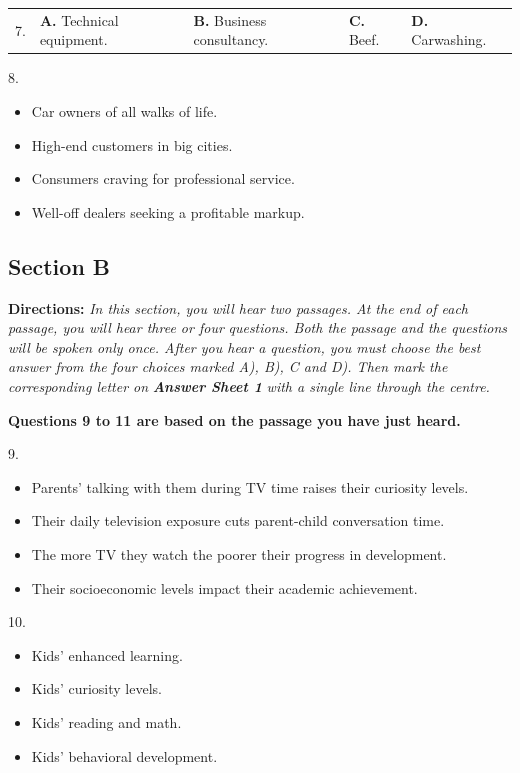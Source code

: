 \documentclass[UTF8,11pt]{ctexart}
\begin{document}
\noindent\begin{tabularx}{\linewidth}{@{}lXXXX@{}}7. & \textbf{A.} Technical equipment. & \textbf{B.} Business consultancy. & \textbf{C.} Beef. & \textbf{D.} Carwashing.\\\end{tabularx}\par

8.


\begin{itemize}[leftmargin=2em,itemsep=.2em,topsep=.4em]\item[A.] Car owners of all walks of life.
\item[B.] High-end customers in big cities.
\item[C.] Consumers craving for professional service.
\item[D.] Well-off dealers seeking a profitable markup.
\end{itemize}

\subsection*{\textbf{Section B}}


\textbf{Directions:} \textit{In this section, you will hear two passages. At the end of each passage, you will hear three or four} \textit{questions. Both the passage and the questions will be spoken only once. After you hear a question, you must} \textit{choose the best answer from the four choices marked A), B), C and D). Then mark the corresponding letter on} \textbf{\textit{Answer Sheet 1}}\textit{ with a single line through the centre.}


\textbf{Questions 9 to 11 are based on the passage you have just heard.}


9.


\begin{itemize}[leftmargin=2em,itemsep=.2em,topsep=.4em]\item[A.] Parents’ talking with them during TV time raises their curiosity levels.
\item[B.] Their daily television exposure cuts parent-child conversation time.
\item[C.] The more TV they watch the poorer their progress in development.
\item[D.] Their socioeconomic levels impact their academic achievement.
\end{itemize}

10.


\begin{itemize}[leftmargin=2em,itemsep=.2em,topsep=.4em]\item[A.] Kids’ enhanced learning.
\item[B.] Kids’ curiosity levels.
\item[C.] Kids’ reading and math.
\item[D.] Kids’ behavioral development.
\end{itemize}
\end{document}
